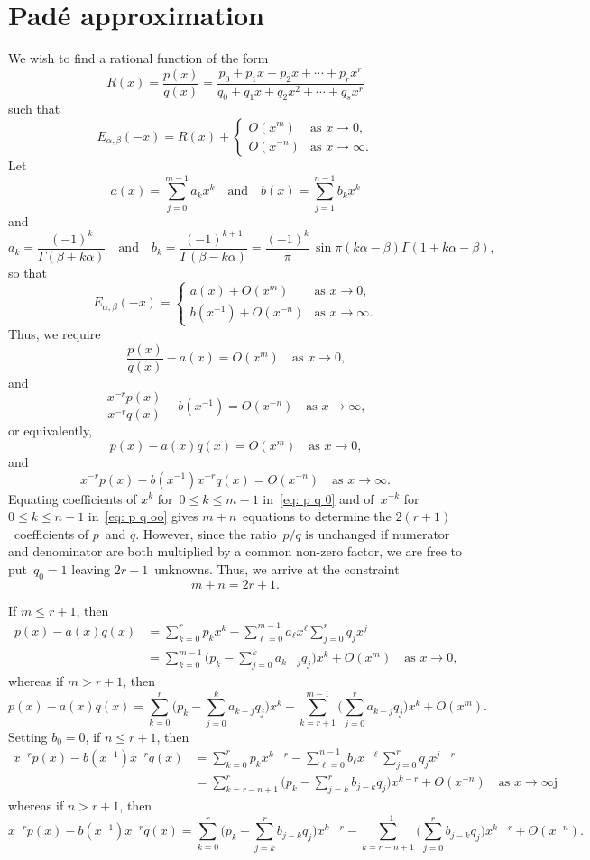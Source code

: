 \documentclass[12pt,a4paper]{article}
\begin{document}
\section{Pad\'e approximation}
We wish to find a rational function of the form
\[
R(x)=\frac{p(x)}{q(x)}
=\frac{p_0+p_1x+p_2x+\cdots+p_rx^r}{q_0+q_1x+q_2x^2+\cdots+q_sx^r}
\]
such that
\[
E_{\alpha,\beta}(-x)=R(x)+\begin{cases}
    O(x^m)&\text{as $x\to0$,}\\
    O(x^{-n})&\text{as $x\to\infty$.}
\end{cases}
\]
Let
\[
a(x)=\sum_{j=0}^{m-1}a_kx^k\quad\text{and}\quad
b(x)=\sum_{j=1}^{n-1}b_kx^k
\]
and
\[
a_k=\frac{(-1)^k}{\Gamma(\beta+k\alpha)}
\quad\text{and}\quad
b_k=\frac{(-1)^{k+1}}{\Gamma(\beta-k\alpha)}
    =\frac{(-1)^k}{\pi}\,\sin\pi(k\alpha-\beta)\Gamma(1+k\alpha-\beta),
\]
so that
\[
E_{\alpha,\beta}(-x)=\begin{cases}
    a(x)+O(x^m)&\text{as $x\to0$,}\\
    b(x^{-1})+O(x^{-n})&\text{as $x\to\infty$.}
\end{cases}
\]
Thus, we require
\begin{equation}\label{eq: p q 0}
\frac{p(x)}{q(x)}-a(x)=O(x^m)\quad\text{as $x\to0$,}
\end{equation}
and
\begin{equation}\label{eq: p q oo}
\frac{x^{-r}p(x)}{x^{-r}q(x)}-b(x^{-1})=O(x^{-n})\quad\text{as $x\to\infty$,}
\end{equation}
or equivalently,
\[
p(x)-a(x)q(x)=O(x^m)\quad\text{as $x\to0$,}
\]
and
\[
x^{-r}p(x)-b(x^{-1})x^{-r}q(x)=O(x^{-n})\quad\text{as $x\to\infty$.}
\]
Equating coefficients of $x^k$ for~$0\le k\le m-1$ in~\eqref{eq: p q 0} and
of~$x^{-k}$ for~$0\le k\le n-1$ in~\eqref{eq: p q oo} gives $m+n$~equations
to determine the $2(r+1)$~coefficients of $p$~and $q$.  However, since the 
ratio~$p/q$ is unchanged if numerator and denominator are both multiplied by a 
common non-zero factor, we are free to put~$q_0=1$ leaving $2r+1$~unknowns.  
Thus, we arrive at the constraint
\[
m+n=2r+1.
\]

If $m\le r+1$, then
\begin{align*}
p(x)-a(x)q(x)&=\sum_{k=0}^rp_kx^k-\sum_{\ell=0}^{m-1}a_\ell x^\ell
    \sum_{j=0}^r q_jx^j\\
&=\sum_{k=0}^{m-1}\biggl(p_k-\sum_{j=0}^k a_{k-j}q_j\biggr)x^k
    +O(x^m)\quad\text{as $x\to0$,}
\end{align*}
whereas if $m>r+1$, then
\[
p(x)-a(x)q(x)=\sum_{k=0}^r\biggl(p_k-\sum_{j=0}^k a_{k-j}q_j\biggr)x^k
    -\sum_{k=r+1}^{m-1}\biggl(\sum_{j=0}^r a_{k-j}q_j\biggr)x^k+O(x^m).
\]
Setting $b_0=0$, if $n\le r+1$, then
\begin{align*}
x^{-r}p(x)-b(x^{-1})x^{-r}q(x)&=\sum_{k=0}^r p_kx^{k-r}
    -\sum_{\ell=0}^{n-1}b_\ell x^{-\ell}\sum_{j=0}^r q_jx^{j-r}\\
    &=\sum_{k=r-n+1}^r\biggl(p_k-\sum_{j=k}^rb_{j-k}q_j\biggr)x^{k-r}
    +O(x^{-n})\quad\text{as $x\to\infty$j}
\end{align*}
whereas if $n>r+1$, then
\[
x^{-r}p(x)-b(x^{-1})x^{-r}q(x)
    =\sum_{k=0}^r\biggl(p_k-\sum_{j=k}^rb_{j-k}q_j\biggr)x^{k-r}
    -\sum_{k=r-n+1}^{-1}\biggl(\sum_{j=0}^rb_{j-k}q_j\biggr)x^{k-r}+O(x^{-n}).
\]
\end{document}
